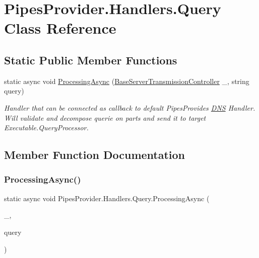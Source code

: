 \hypertarget{class_pipes_provider_1_1_handlers_1_1_query}{}\section{Pipes\+Provider.\+Handlers.\+Query Class Reference}
\label{class_pipes_provider_1_1_handlers_1_1_query}
\subsection*{Static Public Member Functions}
\begin{DoxyCompactItemize}
\item 
static async void \mbox{\hyperlink{class_pipes_provider_1_1_handlers_1_1_query_a3f08c44bfaf5e720d6dfbd791227c8fe}{Processing\+Async}} (\mbox{\hyperlink{class_pipes_provider_1_1_server_1_1_transmission_controllers_1_1_base_server_transmission_controller}{Base\+Server\+Transmission\+Controller}} \+\_\+, string query)
\begin{DoxyCompactList}\small\item\em Handler that can be connected as callback to default Pipes\+Provides \mbox{\hyperlink{class_pipes_provider_1_1_handlers_1_1_d_n_s}{D\+NS}} Handler. Will validate and decompose querie on parts and send it to target Executable.\+Query\+Processor. \end{DoxyCompactList}\end{DoxyCompactItemize}


\subsection{Member Function Documentation}
\mbox{\label{class_pipes_provider_1_1_handlers_1_1_query_a3f08c44bfaf5e720d6dfbd791227c8fe}} 
\subsubsection{\texorpdfstring{Processing\+Async()}{ProcessingAsync()}}
{\footnotesize\ttfamily static async void Pipes\+Provider.\+Handlers.\+Query.\+Processing\+Async (\begin{DoxyParamCaption}\item[{\mbox{\hyperlink{class_pipes_provider_1_1_server_1_1_transmission_controllers_1_1_base_server_transmission_controller}{Base\+Server\+Transmission\+Controller}}}]{\+\_\+,  }\item[{string}]{query }\end{DoxyParamCaption})\hspace{0.3cm}{\ttfamily [static]}}



